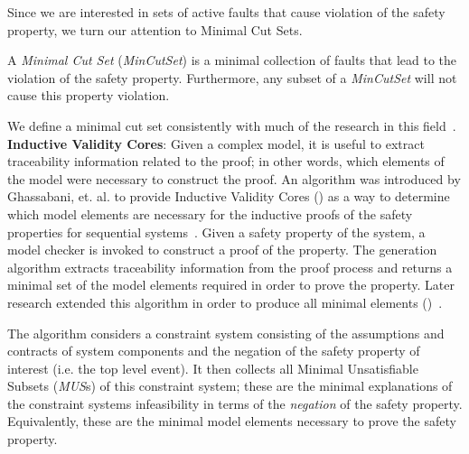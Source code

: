 Since we are interested in sets of active faults that cause violation of the safety property, we turn our attention to Minimal Cut Sets. 
\begin{definition}
A \textit{Minimal Cut Set} (\textit{MinCutSet}) is a minimal collection of faults that lead to the violation of the safety property. Furthermore, any subset of a \textit{MinCutSet} will not cause this property violation. 
\end{definition}
We define a minimal cut set consistently with much of the research in this field~\cite{0f356f05e72f43018211b36f97c8854a,historyFTA}.\\

\textbf{Inductive Validity Cores}: Given a complex model, it is useful to extract traceability information related to the proof; in other words, which elements of the model were necessary to construct the proof. An algorithm was introduced by Ghassabani, et. al. to provide Inductive Validity Cores (\ivc) as a way to determine which model elements are necessary for the inductive proofs of the safety properties for sequential systems~\cite{GhassabaniGW16}. Given a safety property of the system, a model checker is invoked to construct a proof of the property. The \ivc generation algorithm extracts traceability information from the proof process and returns a minimal set of the model elements required in order to prove the property. Later research extended this algorithm in order to produce all minimal \ivc elements (\aivcalg)~\cite{Ghassabani2017EfficientGO,bendik2018online}. 

The \aivcalg algorithm considers a constraint system consisting of the assumptions and contracts of system components and the negation of the safety property of interest (i.e. the top level event). It then collects all Minimal Unsatisfiable Subsets (\textit{MUS}s) of this constraint system; these are the minimal explanations of the constraint systems infeasibility in terms of the \textit{negation} of the safety property. Equivalently, these are the minimal model elements necessary to prove the safety property.%





